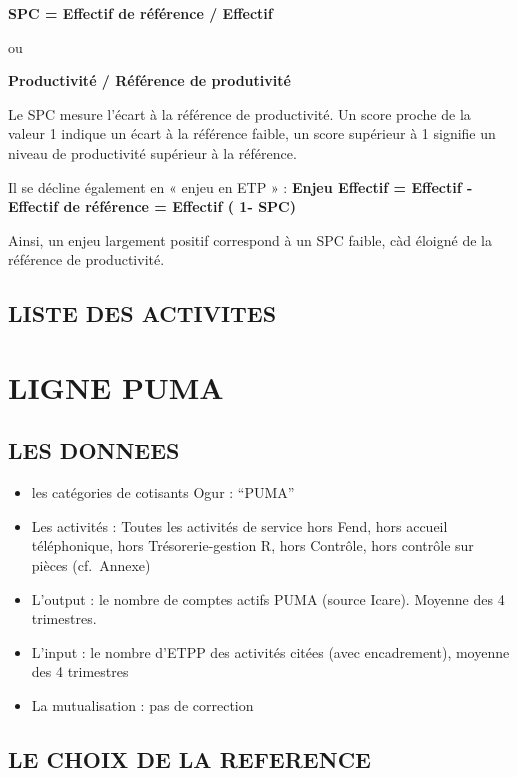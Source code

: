 \documentclass[
]{book}
\begin{document}
\textbf{SPC = Effectif de référence / Effectif}

ou

\textbf{Productivité / Référence de produtivité}

Le SPC mesure l'écart à la référence de productivité. Un score proche de la valeur 1 indique un écart à la référence faible, un score supérieur à 1 signifie un niveau de productivité supérieur à la référence.

Il se décline également en « enjeu en ETP » :
\textbf{Enjeu Effectif = Effectif - Effectif de référence = Effectif ( 1- SPC)}

Ainsi, un enjeu largement positif correspond à un SPC faible, càd éloigné de la référence de productivité.

\hypertarget{liste-des-activites-3}{%
\section{LISTE DES ACTIVITES}\label{liste-des-activites-3}}

\hypertarget{ligne-puma}{%
\chapter{LIGNE PUMA}\label{ligne-puma}}

\hypertarget{les-donnees-10}{%
\section{LES DONNEES}\label{les-donnees-10}}

\begin{itemize}
\item
  les catégories de cotisants Ogur : ``PUMA''
\item
  Les activités :
  Toutes les activités de service hors Fend, hors accueil téléphonique, hors Trésorerie-gestion R, hors Contrôle, hors contrôle sur pièces (cf.~Annexe)
\item
  L'output : le nombre de comptes actifs PUMA (source Icare). Moyenne des 4 trimestres.
\item
  L'input : le nombre d'ETPP des activités citées (avec encadrement), moyenne des 4 trimestres
\item
  La mutualisation : pas de correction
\end{itemize}

\hypertarget{le-choix-de-la-reference-5}{%
\section{LE CHOIX DE LA REFERENCE}\label{le-choix-de-la-reference-5}}
\end{document}
